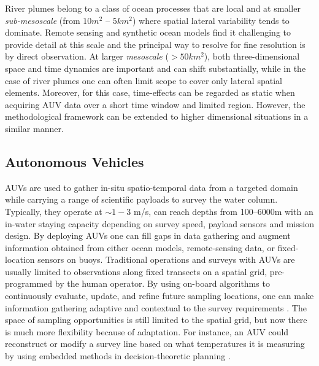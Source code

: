 \documentclass[aoas]{imsart}
\begin{document}


River plumes belong to a class of ocean processes that are local and
at smaller \emph{sub-mesoscale} (from $10 m^2$ -- $5 km^2$) where
spatial lateral variability tends to dominate. Remote sensing and
synthetic ocean models find it challenging to provide detail at this
scale \citep{Lermusiaux:2006} and the principal way to resolve for
fine resolution is by direct observation. At larger \emph{mesoscale}
($>50 km^2$), both three-dimensional space and time dynamics are
important and can shift substantially, while in the case of river
plumes one can often limit scope to cover only lateral spatial
elements. Moreover, for this case, time-effects can be regarded as
static when acquiring AUV data over a short time window and limited
region. However, the methodological framework can be extended to
higher dimensional situations in a similar manner.

\subsection{Autonomous Vehicles}

AUVs are used to gather in-situ spatio-temporal data from a targeted
domain while carrying a range of scientific payloads to survey the
water column.  Typically, they operate at $\sim 1-3$ m/s, can reach
depths from 100--6000m with an in-water staying capacity depending on
survey speed, payload sensors and mission design. By deploying AUVs
one can fill gaps in data gathering and augment information obtained
from either ocean models, remote-sensing data, or fixed-location
sensors on buoys. Traditional operations and surveys with AUVs are
usually limited to observations along fixed transects on a spatial
grid, pre-programmed by the human operator.  By using on-board
algorithms to continuously evaluate, update, and refine future
sampling locations, one can make information gathering adaptive and
contextual to the survey requirements
\citep{das11b,fossuminformation,fossum18b}. The space of sampling
opportunities is still limited to the spatial grid, but now there is
much more flexibility because of adaptation. For instance, an AUV
could reconstruct or modify a survey line based on what temperatures
it is measuring by using embedded methods in decision-theoretic
planning \citep{py10,Rajan12,Rajan12b}.
\end{document}

